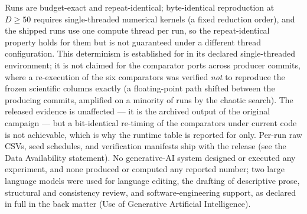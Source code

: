 Runs are budget-exact and
repeat-identical; byte-identical reproduction at $D \geq 50$ requires
single-threaded numerical kernels (a fixed reduction order), and the
shipped runs use one compute thread per run, so the repeat-identical
property holds for them but is not guaranteed under a different thread
configuration. This determinism is established for \dtgsk{} in its
declared single-threaded environment; it is not claimed for the
comparator ports across producer commits, where a re-execution of the
six comparators was verified \emph{not} to reproduce the frozen
scientific columns exactly (a floating-point path shifted between the
producing commits, amplified on a minority of runs by the chaotic
search). The released evidence is unaffected --- it is the archived
output of the original campaign --- but a bit-identical re-timing of the
comparators under current code is not achievable, which is why the
runtime table is reported for \dtgsk{} only. Per-run raw
CSVs, seed schedules, and verification manifests ship with the
release (see the Data Availability statement).
No generative-AI system designed or executed any experiment, and none
produced or computed any reported number; two large language models were
used for language editing, the drafting of descriptive prose, structural
and consistency review, and software-engineering support, as
declared in full in the back matter (Use of Generative Artificial
Intelligence).

